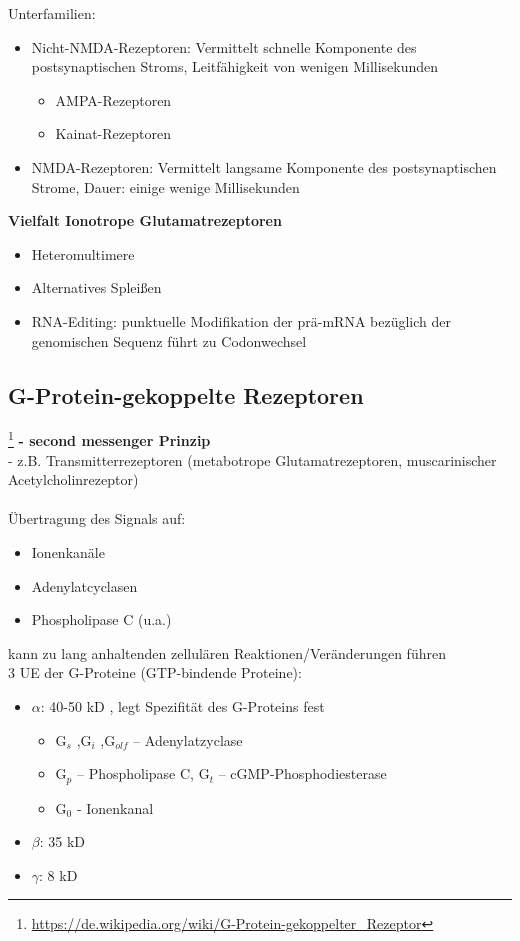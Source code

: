 Unterfamilien:
\begin{itemize}
	\item Nicht-NMDA-Rezeptoren: Vermittelt schnelle Komponente des postsynaptischen Stroms, Leitfähigkeit von wenigen Millisekunden
		\begin{itemize}
			\item AMPA-Rezeptoren
			\item Kainat-Rezeptoren
		\end{itemize}
	\item NMDA-Rezeptoren: Vermittelt langsame Komponente des postsynaptischen Strome, Dauer: einige wenige Millisekunden
\end{itemize}

\textbf{Vielfalt Ionotrope Glutamatrezeptoren}
\begin{itemize}
	\item Heteromultimere
	\item Alternatives Spleißen
	\item RNA-Editing: punktuelle Modifikation der prä-mRNA bezüglich der genomischen Sequenz führt zu Codonwechsel
\end{itemize}

\subsection{G-Protein-gekoppelte Rezeptoren}\footnote{\url{https://de.wikipedia.org/wiki/G-Protein-gekoppelter_Rezeptor}}
 \textbf{- second messenger Prinzip}\\
 - z.B. Transmitterrezeptoren (metabotrope Glutamatrezeptoren, muscarinischer Acetylcholinrezeptor)\\\\
Übertragung des Signals auf:
\begin{itemize}
	\item Ionenkanäle
	\item Adenylatcyclasen
	\item Phospholipase C (u.a.)
\end{itemize}
kann zu lang anhaltenden zellulären Reaktionen/Veränderungen führen\\

3 UE der G-Proteine (GTP-bindende Proteine):
\begin{itemize}
	\item $\alpha$: 40-50 kD , legt Spezifität des G-Proteins fest
		\begin{itemize}
			\item G$_s$ ,G$_i$ ,G$_{olf}$ – Adenylatzyclase
			\item G$_p$ – Phospholipase C, G$_t$ – cGMP-Phosphodiesterase
			\item G$_0$ - Ionenkanal
		\end{itemize}
	\item $\beta$: 35 kD
	\item $\gamma$: 8 kD
\end{itemize}

